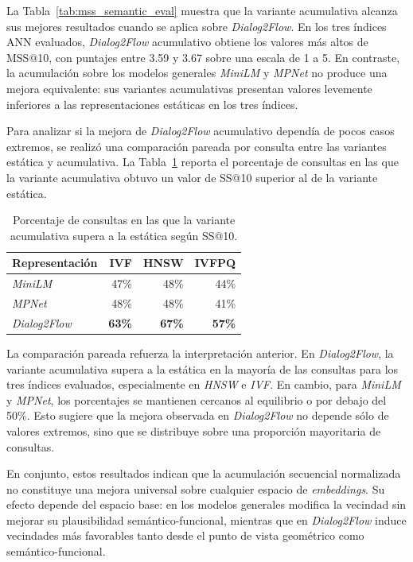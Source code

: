 \documentclass[runningheads]{llncs}
\begin{document}
La Tabla~\ref{tab:mss_semantic_eval} muestra que la variante acumulativa alcanza sus mejores resultados cuando se aplica sobre \textit{Dialog2Flow}. En los tres índices ANN evaluados, \textit{Dialog2Flow} acumulativo obtiene los valores más altos de MSS@10, con puntajes entre 3.59 y 3.67 sobre una escala de 1 a 5. En contraste, la acumulación sobre los modelos generales \textit{MiniLM} y \textit{MPNet} no produce una mejora equivalente: sus variantes acumulativas presentan valores levemente inferiores a las representaciones estáticas en los tres índices.

Para analizar si la mejora de \textit{Dialog2Flow} acumulativo dependía de pocos casos extremos, se realizó una comparación pareada por consulta entre las variantes estática y acumulativa. La Tabla~\ref{tab:paired_semantic_eval} reporta el porcentaje de consultas en las que la variante acumulativa obtuvo un valor de SS@10 superior al de la variante estática.

\begin{table}[ht]
\centering
\small
\setlength{\tabcolsep}{6pt}
\caption{Porcentaje de consultas en las que la variante acumulativa supera a la estática según SS@10.}
\label{tab:paired_semantic_eval}
\begin{tabular}{lrrr}
\toprule
Representación & IVF & HNSW & IVFPQ \\
\midrule
\textit{MiniLM} & 47\% & 48\% & 44\% \\
\textit{MPNet} & 48\% & 48\% & 41\% \\
\textit{Dialog2Flow} & \textbf{63\%} & \textbf{67\%} & \textbf{57\%} \\
\bottomrule
\end{tabular}
\end{table}

La comparación pareada refuerza la interpretación anterior. En \textit{Dialog2Flow}, la variante acumulativa supera a la estática en la mayoría de las consultas para los tres índices evaluados, especialmente en \textit{HNSW} e \textit{IVF}. En cambio, para \textit{MiniLM} y \textit{MPNet}, los porcentajes se mantienen cercanos al equilibrio o por debajo del 50\%. Esto sugiere que la mejora observada en \textit{Dialog2Flow} no depende sólo de valores extremos, sino que se distribuye sobre una proporción mayoritaria de consultas.

En conjunto, estos resultados indican que la acumulación secuencial normalizada no constituye una mejora universal sobre cualquier espacio de \textit{embeddings}. Su efecto depende del espacio base: en los modelos generales modifica la vecindad sin mejorar su plausibilidad semántico-funcional, mientras que en \textit{Dialog2Flow} induce vecindades más favorables tanto desde el punto de vista geométrico como semántico-funcional.
\end{document}

